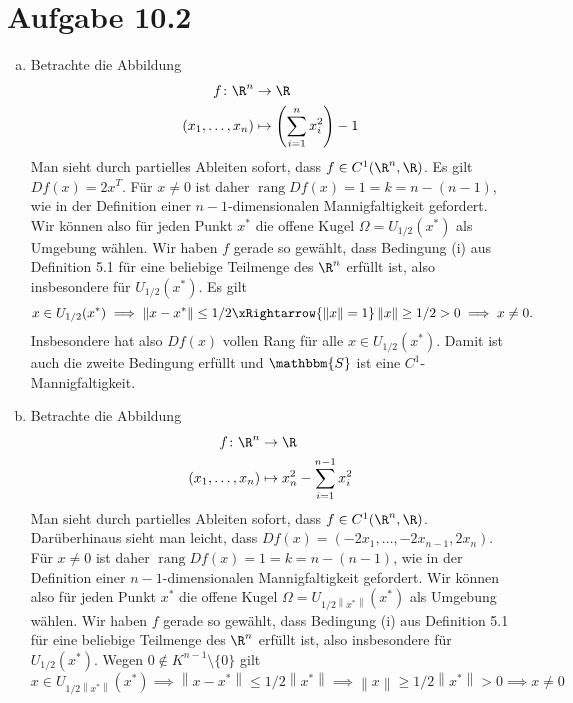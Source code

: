 \documentclass{article}
\newcommand{\norm}[1]{\left\lVert #1 \right\rVert}
\begin{document}
    \section*{Aufgabe 10.2}
    \begin{enumerate}[(a)]
        \item Betrachte die Abbildung
        \begin{align*}
            f\colon \R^n &\to \R\\
            (x_1, \dots, x_n) &\mapsto \left(\sum_{i = 1}^{n} x_i^2\right) - 1
        \end{align*}
        Man sieht durch partielles Ableiten sofort, dass $f \in C^1(\R^n, \R)$.
        Es gilt $Df(x) = 2x^T$. Für $x \neq 0$ ist daher $\operatorname{rang} Df(x) = 1 = k = n- (n-1)$, 
        wie in der Definition einer $n-1$-dimensionalen Mannigfaltigkeit gefordert.
        Wir können also für jeden Punkt $x^*$ die offene Kugel $\Omega = U_{1/2}(x^*)$ als Umgebung wählen.
        Wir haben $f$ gerade so gewählt, dass Bedingung (i) aus Definition 5.1 für eine beliebige Teilmenge des $\R^n$ erfüllt ist,
        also insbesondere für $U_{1/2}(x^*)$.
        Es gilt
        \[ 
            x \in U_{1/2}(x^*) \implies \norm{x - x^*} \leq 1/2 \xRightarrow{\norm{x} = 1} \norm{x} \geq 1/2 > 0 \implies x \neq 0.
        \]
        Insbesondere hat also $Df(x)$ vollen Rang für alle $x\in U_{1/2}(x^*)$.
        Damit ist auch die zweite Bedingung erfüllt und $\mathbbm{S}$ ist eine $C^1$-Mannigfaltigkeit.
        \item Betrachte die Abbildung
        \begin{align*}
            f\colon \R^n &\to \R\\
            (x_1, \dots, x_n) &\mapsto x_n^2 - \sum_{i = 1}^{n-1} x_i^2
        \end{align*}
        Man sieht durch partielles Ableiten sofort, dass $f \in C^1(\R^n, \R)$.
        Darüberhinaus sieht man leicht, dass $Df(x) = (-2x_1, \dots, -2x_{n-1}, 2x_n)$. Für $x \neq 0$ ist daher $\operatorname{rang} Df(x) = 1 = k = n- (n-1)$, 
        wie in der Definition einer $n-1$-dimensionalen Mannigfaltigkeit gefordert.
        Wir können also für jeden Punkt $x^*$ die offene Kugel $\Omega = U_{1/2\norm{x^*}}(x^*)$ als Umgebung wählen.
        Wir haben $f$ gerade so gewählt, dass Bedingung (i) aus Definition 5.1 für eine beliebige Teilmenge des $\R^n$ erfüllt ist,
        also insbesondere für $U_{1/2}(x^*)$.
        Wegen $0\notin K^{n-1}\setminus\{0\}$ gilt
        \[ 
            x \in U_{1/2\norm{x^*}}(x^*) \implies \norm{x - x^*} \leq 1/2\norm{x^*} \implies \norm{x} \geq 1/2\norm{x^*} > 0 \implies x \neq 0
\]
\end{enumerate}
\end{document}
